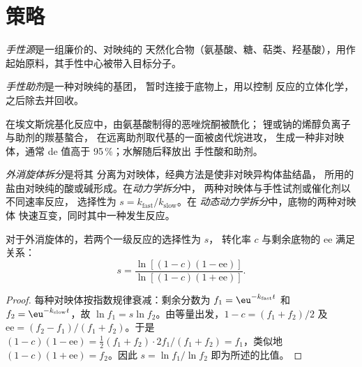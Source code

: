 \section{策略}

\begin{definition}[手性源]\label{def:b3:asymmetric-synthesis:chiral-pool}
\emph{手性源}是一组廉价的、对映纯的
天然化合物（氨基酸、糖、萜类、羟基酸），用作
起始原料，其手性中心被带入目标分子。
\end{definition}

\begin{definition}[手性助剂]\label{def:b3:asymmetric-synthesis:auxiliary}
\emph{手性助剂}是一种对映纯的基团，
暂时连接于底物上，用以控制
反应的立体化学，之后除去并回收。
\end{definition}

在埃文斯烷基化反应中，由氨基酸制得的恶唑烷酮被酰化；
锂或钠的烯醇负离子与助剂的羰基螯合，
在远离助剂取代基的一面被卤代烷进攻，
生成一种非对映体，通常 de 值高于 95\,\%；水解随后释放出
手性酸和助剂。

\begin{definition}[拆分]\label{def:b3:asymmetric-synthesis:resolution}
\emph{外消旋体拆分}是将其
分离为对映体，经典方法是使非对映异构体盐结晶，
所用的盐由对映纯的酸或碱形成。在\emph{动力学拆分}中，
两种对映体与手性试剂或催化剂以不同速率反应，
选择性为 $s = k_{\mathrm{fast}}/k_{\mathrm{slow}}$。在
\emph{动态动力学拆分}中，底物的两种对映体
快速互变，同时其中一种发生反应。
\end{definition}

\begin{theorem}[卡甘方程]\label{thm:b3:asymmetric-synthesis:kagan}
对于外消旋体的，若两个一级反应的选择性为 $s$，
转化率 $c$ 与剩余底物的 ee 满足关系：
\[
  s = \frac{\ln[(1 - c)(1 - \mathrm{ee})]}{\ln[(1 - c)(1 + \mathrm{ee})]}.
\]
\end{theorem}

\begin{proof}
每种对映体按指数规律衰减：剩余分数为 $f_1 = \eu^{-k_{\mathrm{fast}}t}$ 和
$f_2 = \eu^{-k_{\mathrm{slow}}t}$，故 $\ln f_1 = s\ln f_2$。由等量出发，$1 - c = (f_1 + f_2)/2$ 及
$\mathrm{ee} = (f_2 - f_1)/(f_1 + f_2)$。于是 $(1 - c)(1 - \mathrm{ee}) = \tfrac12(f_1 + f_2)\cdot 2f_1/(f_1 + f_2) = f_1$，类似地
$(1 - c)(1 + \mathrm{ee}) = f_2$。因此 $s = \ln f_1/\ln f_2$ 即为所述的比值。
\end{proof}

